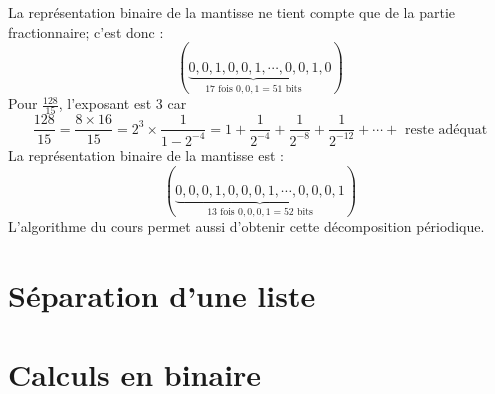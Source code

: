 \begin{enumerate}
La représentation binaire de la mantisse ne tient compte que de la partie fractionnaire; c'est donc :
\begin{displaymath}
  (\underset{17 \text{ fois } 0,0,1 = 51 \text{ bits}}{\underbrace{0,0,1,0,0,1,\cdots,0,0,1}},0)
\end{displaymath}
Pour $\frac{128}{15}$, l'exposant est $3$ car
\begin{displaymath}
\frac{128}{15} = \frac{8\times 16}{15} = 2^3 \times \frac{1}{1-2^{-4}}  
= 1 + \frac{1}{2^{-4}}+ \frac{1}{2^{-8}}+ \frac{1}{2^{-12}}+\cdots+ \text{ reste adéquat}
\end{displaymath}
La représentation binaire de la mantisse est :
\begin{displaymath}
  (\underset{13 \text{ fois } 0,0,0,1 = 52 \text{ bits}}{\underbrace{0,0,0,1,0,0,0,1,\cdots,0,0,0,1}})
\end{displaymath}
L'algorithme du cours permet aussi d'obtenir cette décomposition périodique.
\end{enumerate}

\section{Séparation d'une liste}

\section{Calculs en binaire}

